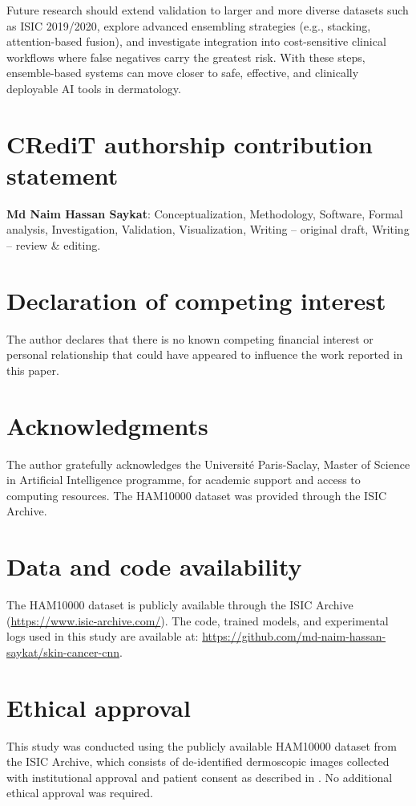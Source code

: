 \documentclass[preprint,12pt]{elsarticle}
\begin{document}
Future research should extend validation to larger and more diverse datasets such as ISIC 2019/2020, 
explore advanced ensembling strategies (e.g., stacking, attention-based fusion), 
and investigate integration into cost-sensitive clinical workflows where false negatives carry the greatest risk. 
With these steps, ensemble-based systems can move closer to safe, effective, and clinically deployable 
AI tools in dermatology.

\section*{CRediT authorship contribution statement}
\textbf{Md Naim Hassan Saykat}: Conceptualization, Methodology, Software, Formal analysis, 
Investigation, Validation, Visualization, Writing – original draft, Writing – review \& editing.  

\section*{Declaration of competing interest}
The author declares that there is no known competing financial interest or personal relationship 
that could have appeared to influence the work reported in this paper.  

\section*{Acknowledgments}
The author gratefully acknowledges the Université Paris-Saclay, Master of Science in Artificial Intelligence programme, 
for academic support and access to computing resources.  
The HAM10000 dataset was provided through the ISIC Archive.  

\section*{Data and code availability}
The HAM10000 dataset is publicly available through the ISIC Archive 
(\href{https://www.isic-archive.com/}{https://www.isic-archive.com/}).  
The code, trained models, and experimental logs used in this study are available at:  
\href{https://github.com/md-naim-hassan-saykat/skin-cancer-cnn}{https://github.com/md-naim-hassan-saykat/skin-cancer-cnn}.  

\section*{Ethical approval}
This study was conducted using the publicly available HAM10000 dataset from the ISIC Archive, 
which consists of de-identified dermoscopic images collected with institutional approval and patient consent 
as described in \citep{tschandl2018ham10000}.  
No additional ethical approval was required.

    
\end{document}
